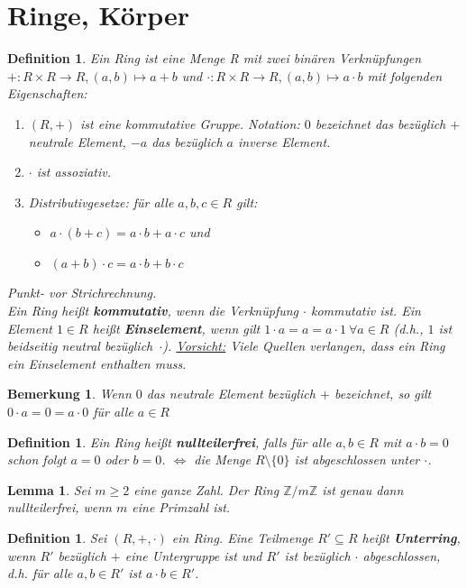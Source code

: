 \documentclass[12pt,a4paper]{article}
\theoremstyle{plain}
\newtheorem{Lemma}[Theorem]{Lemma}
\newtheorem{Definition}[Theorem]{Definition}
\newtheorem{Bemerkung}[Theorem]{Bemerkung}
\newcommand{\herv}[1]{{\emph{\textbf{#1}}}}
\newcommand{\Z}{\mathbb{Z}}
\numberwithin{equation}{section}
\begin{document}
\section{Ringe, Körper}
\begin{Definition}
Ein Ring ist eine Menge R mit zwei binären Verknüpfungen $+:R\times R\rightarrow R, (a,b)\mapsto a+b$ und $\cdot :R\times R\rightarrow R, (a,b)\mapsto a\cdot b$ mit folgenden Eigenschaften:
\begin{enumerate}
\renewcommand{\labelenumi}{\emph{(R\arabic{enumi})}}
\item $(R,+)$ ist eine kommutative Gruppe. Notation: $0$ bezeichnet das bezüglich $+$ neutrale Element, $-a$ das bezüglich $a$ inverse Element.
\item $\cdot$ ist assoziativ.
\item Distributivgesetze: für alle $a,b,c\in R$ gilt:
\begin{itemize}
\item $a\cdot(b+c)=a\cdot b+ a\cdot c$ und
\item $(a+b)\cdot c= a\cdot b + b\cdot c$
\end{itemize}
\end{enumerate}
\glqq Punkt- vor Strichrechnung\grqq. \\
Ein Ring heißt \herv{kommutativ}, wenn die Verknüpfung $\cdot$ kommutativ ist. Ein Element $1\in R$ heißt \herv{Einselement}, wenn gilt $1\cdot a=a=a\cdot 1\ \forall a\in R$ (d.h., $1$ ist beidseitig neutral \mbox{bezüglich $\cdot$).} \underline{Vorsicht:} Viele Quellen verlangen, dass ein Ring ein Einselement enthalten muss. 
\end{Definition}
\begin{Bemerkung}
Wenn $0$ das neutrale Element bezüglich $+$ bezeichnet, so gilt $0\cdot a=0=a\cdot 0$ für alle $a\in R$
\end{Bemerkung}
\begin{Definition}
Ein Ring heißt \herv{nullteilerfrei}, falls für alle $a,b\in R$ mit $a\cdot b=0$ schon folgt $a=0$ oder $b=0$. $\Leftrightarrow$ die Menge $R\setminus\{0\}$ ist abgeschlossen unter $\cdot$.
\end{Definition}
\begin{Lemma}
Sei $m\geq 2$ eine ganze Zahl. Der Ring $\Z/m\Z$ ist genau dann nullteilerfrei, wenn $m$ eine Primzahl ist.
\end{Lemma}
\begin{Definition}
Sei $(R,+,\cdot)$ ein Ring. Eine Teilmenge $R'\subseteq R$ heißt \herv{Unterring}, wenn $R'$ bezüglich $+$ eine Untergruppe ist und $R'$ ist bezüglich $\cdot$ abgeschlossen, d.h. für alle $a,b\in R'$ ist $a\cdot b\in R'$.
\end{Definition}
\end{document}
